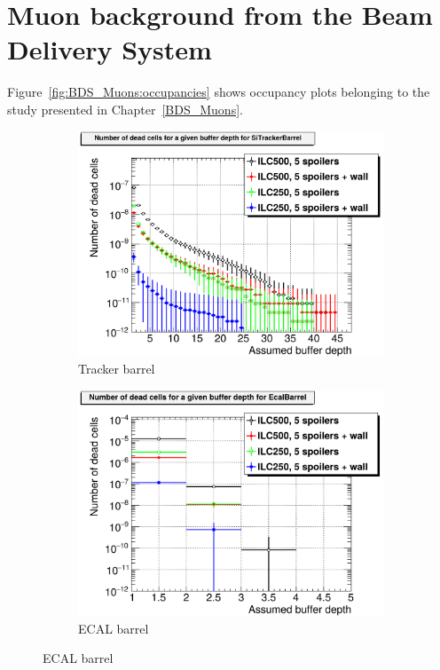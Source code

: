 \chapter{Muon background from the Beam Delivery System}
\label{Appendix:BDS_Muons}
Figure~\ref{fig:BDS_Muons:occupancies} shows occupancy plots belonging to the study presented in Chapter~\ref{BDS_Muons}.
  \begin{figure}[htbp]
 \centering
  \begin{subfigure}[b]{0.49\textwidth}
   \centering
    \includegraphics[width=\textwidth]{Figures/BDS_muons/Occupancy_Comparison_All_layers_deadcells_SiTrackerBarrel.png}
   \caption{\sid Tracker barrel}
   \end{subfigure}
   \hfill
    \begin{subfigure}[b]{0.49\textwidth}
   \centering
    \includegraphics[width=\textwidth]{Figures/BDS_muons/Occupancy_Comparison_All_layers_deadcells_EcalBarrel.png}
   \caption{\sid ECAL barrel}
   \end{subfigure}
  \end{figure}
